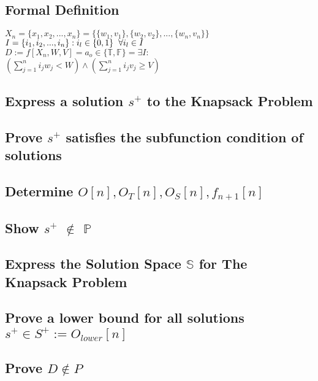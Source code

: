 \documentclass[11pt]{article}
\begin{document}
\subsection{Formal Definition}
\begin{center}
\vspace{8mm}
$
X_n = \{x_1,x_2,...,x_n\} = \{ \{w_1,v_1\},\{w_2,v_2\},...,\{w_n,v_n\} \}
$
\\ \vspace{8mm}
$
I = \{i_1,i_2,...,i_n\}: i_l \in \{0,1\} \hspace{2mm} \forall i_l \in I
$
\\ \vspace{8mm}
$
D := f[X_n,W,V] = a_o \in \{\mathbb{T},\mathbb{F}\} = \exists I:
$
\\ \vspace{2mm}
$
(\sum_{j=1}^n i_j w_j < W) \land (\sum_{j=1}^n i_j v_j \geq V)
$
\end{center}
\vspace{3mm}


\subsection{Express a solution $s^+$ to the Knapsack Problem}
\subsection{Prove $s^+$ satisfies the subfunction condition of solutions}
\subsection{Determine $O[n],O_T[n],O_S[n],f_{n+1}[n]$}
\subsection{Show $s^+$ $\notin$ $\mathbb{P}$}
\subsection{Express the Solution Space $\mathbb{S}$ for The Knapsack Problem}
\subsection{Prove a lower bound for all solutions $s^+ \in S^+ := O_{lower}[n]$}
\subsection{Prove $D \notin P$}
\end{document}
